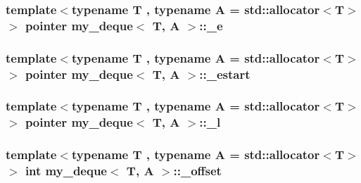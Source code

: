 \hypertarget{classmy__deque_aa9adebd4257de224e119b91ef209abca}{
\subsubsection[{\-\_\-e}]{\setlength{\rightskip}{0pt plus 5cm}template$<$typename T , typename A  = std\-::allocator$<$\-T$>$$>$ {\bf pointer} {\bf my\-\_\-deque}$<$ T, A $>$\-::\-\_\-e\hspace{0.3cm}{\ttfamily [private]}}}\label{classmy__deque_aa9adebd4257de224e119b91ef209abca}
\hypertarget{classmy__deque_ae0e648a3abb9594093b50eaaf09d1e0d}{
\subsubsection[{\-\_\-estart}]{\setlength{\rightskip}{0pt plus 5cm}template$<$typename T , typename A  = std\-::allocator$<$\-T$>$$>$ {\bf pointer} {\bf my\-\_\-deque}$<$ T, A $>$\-::\-\_\-estart\hspace{0.3cm}{\ttfamily [private]}}}\label{classmy__deque_ae0e648a3abb9594093b50eaaf09d1e0d}
\hypertarget{classmy__deque_a3d540bafe793c6ae6ceee0bd78d59a9c}{
\subsubsection[{\-\_\-l}]{\setlength{\rightskip}{0pt plus 5cm}template$<$typename T , typename A  = std\-::allocator$<$\-T$>$$>$ {\bf pointer} {\bf my\-\_\-deque}$<$ T, A $>$\-::\-\_\-l\hspace{0.3cm}{\ttfamily [private]}}}\label{classmy__deque_a3d540bafe793c6ae6ceee0bd78d59a9c}
\hypertarget{classmy__deque_a8f70b94005db4d4780bfd0947568c730}{
\subsubsection[{\-\_\-offset}]{\setlength{\rightskip}{0pt plus 5cm}template$<$typename T , typename A  = std\-::allocator$<$\-T$>$$>$ int {\bf my\-\_\-deque}$<$ T, A $>$\-::\-\_\-offset\hspace{0.3cm}{\ttfamily [private]}}}\label{classmy__deque_a8f70b94005db4d4780bfd0947568c730}
